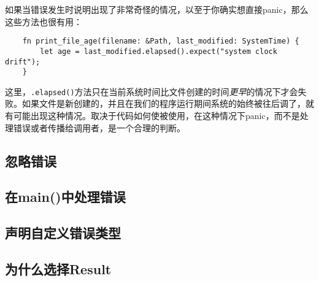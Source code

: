 如果当错误发生时说明出现了非常奇怪的情况，以至于你确实想直接panic，那么这些方法也很有用：
\begin{verbatim}
    fn print_file_age(filename: &Path, last_modified: SystemTime) {
        let age = last_modified.elapsed().expect("system clock drift");
    }
\end{verbatim}

这里，\texttt{.elapsed()}方法只在当前系统时间比文件创建的时间\emph{更早}的情况下才会失败。如果文件是新创建的，并且在我们的程序运行期间系统的始终被往后调了，就有可能出现这种情况。取决于代码如何使被使用，在这种情况下panic，而不是处理错误或者传播给调用者，是一个合理的判断。

\subsection{忽略错误}\label{ignoreerr}

\subsection{在main()中处理错误}

\subsection{声明自定义错误类型}

\subsection{为什么选择Result}
